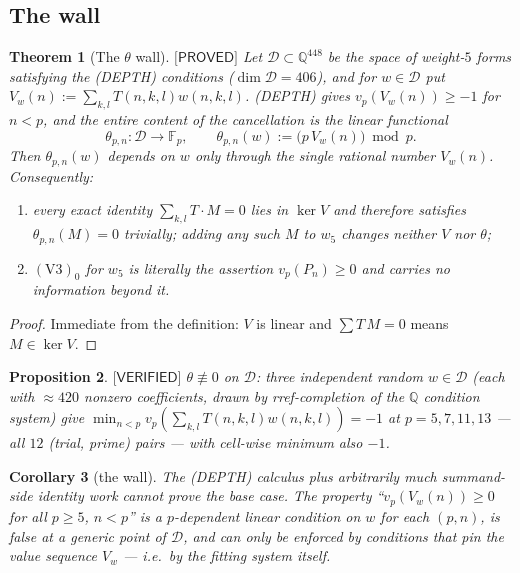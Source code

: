 \documentclass[11pt,reqno]{amsart}
\theoremstyle{plain}
\newtheorem{theorem}{Theorem}[section]
\newtheorem{proposition}[theorem]{Proposition}
\newtheorem{corollary}[theorem]{Corollary}
\theoremstyle{definition}
\theoremstyle{remark}
\numberwithin{equation}{section}
\newcommand{\QQ}{\mathbb{Q}}
\newcommand{\FF}{\mathbb{F}}
\newcommand{\Dcal}{\mathcal{D}}
\newcommand{\wfive}{w_5}
\newcommand{\PROVED}{\textsf{[PROVED]}}
\newcommand{\VERIFIED}{\textsf{[VERIFIED]}}
\begin{document}
\subsection{The wall}

\begin{theorem}[The $\theta$ wall]\label{thm:wall}
$\PROVED$ Let $\Dcal\subset\QQ^{448}$ be the space of weight-$5$ forms satisfying the
\textup{(DEPTH)} conditions ($\dim\Dcal=406$), and for $w\in\Dcal$ put
$V_w(n):=\sum_{k,l}T(n,k,l)w(n,k,l)$. \textup{(DEPTH)} gives $v_p(V_w(n))\ge-1$ for $n<p$, and
the entire content of the cancellation is the linear functional
\[
\theta_{p,n}:\Dcal\to\FF_p,\qquad \theta_{p,n}(w):=\bigl(p\,V_w(n)\bigr)\bmod p .
\]
Then $\theta_{p,n}(w)$ depends on $w$ only through the single rational number $V_w(n)$.
Consequently:
\begin{enumerate}[leftmargin=1.9em,label=\textup{(\arabic*)}]
\item every exact identity $\sum_{k,l}T\cdot M=0$ lies in $\ker V$ and therefore satisfies
  $\theta_{p,n}(M)=0$ trivially; adding any such $M$ to $\wfive$ changes neither $V$ nor
  $\theta$;
\item $(\mathrm V3)_0$ for $\wfive$ is \emph{literally} the assertion $v_p(P_n)\ge0$ and
  carries no information beyond it.
\end{enumerate}
\end{theorem}

\begin{proof}
Immediate from the definition: $V$ is linear and $\sum T\,M=0$ means $M\in\ker V$.
\end{proof}

\begin{proposition}\label{prop:thetanonzero}
$\VERIFIED$ $\theta\not\equiv0$ on $\Dcal$: three independent random $w\in\Dcal$ (each with
$\approx420$ nonzero coefficients, drawn by rref-completion of the $\QQ$ condition system) give
$\min_{n<p}v_p(\sum_{k,l}T(n,k,l)w(n,k,l))=-1$ at $p=5,7,11,13$ --- all $12$ (trial, prime)
pairs --- with cell-wise minimum also $-1$.
\end{proposition}

\begin{corollary}[the wall]\label{cor:wall}
The \textup{(DEPTH)} calculus \emph{plus arbitrarily much summand-side identity work} cannot
prove the base case. The property ``$v_p(V_w(n))\ge0$ for all $p\ge5$, $n<p$'' is a
$p$-\emph{dependent} linear condition on $w$ for each $(p,n)$, is false at a generic point of
$\Dcal$, and can only be enforced by conditions that pin the value sequence $V_w$ --- i.e.\ by
the fitting system itself.
\end{corollary}
\end{document}
